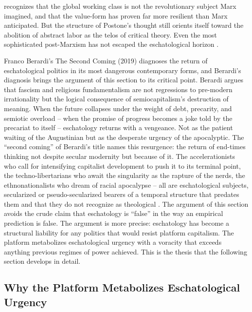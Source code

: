 recognizes that the global working class is not the revolutionary subject Marx imagined, and that the value-form has proven far more resilient than Marx anticipated. But the structure of Postone’s thought still orients itself toward the abolition of abstract labor as the telos of critical theory. Even the most sophisticated post-Marxism has not escaped the eschatological horizon \cite[pp.~4-7, 296-380]{postone_1993}.

Franco Berardi’s The Second Coming (2019) diagnoses the return of eschatological politics in its most dangerous contemporary forms, and Berardi’s diagnosis brings the argument of this section to its critical point. Berardi argues that fascism and religious fundamentalism are not regressions to pre-modern irrationality but the logical consequence of semiocapitalism’s destruction of meaning. When the future collapses under the weight of debt, precarity, and semiotic overload – when the promise of progress becomes a joke told by the precariat to itself – eschatology returns with a vengeance. Not as the patient waiting of the Augustinian but as the desperate urgency of the apocalyptic. The “second coming” of Berardi’s title names this resurgence: the return of end-times thinking not despite secular modernity but because of it. The accelerationists who call for intensifying capitalist development to push it to its terminal point, the techno-libertarians who await the singularity as the rapture of the nerds, the ethnonationalists who dream of racial apocalypse – all are eschatological subjects, secularized or pseudo-secularized bearers of a temporal structure that predates them and that they do not recognize as theological \cite[pp.~45-72]{berardi_2019}. The argument of this section avoids the crude claim that eschatology is “false” in the way an empirical prediction is false. The argument is more precise: eschatology has become a structural liability for any politics that would resist platform capitalism. The platform metabolizes eschatological urgency with a voracity that exceeds anything previous regimes of power achieved. This is the thesis that the following section develops in detail.

\subsection{Why the Platform Metabolizes Eschatological Urgency}

